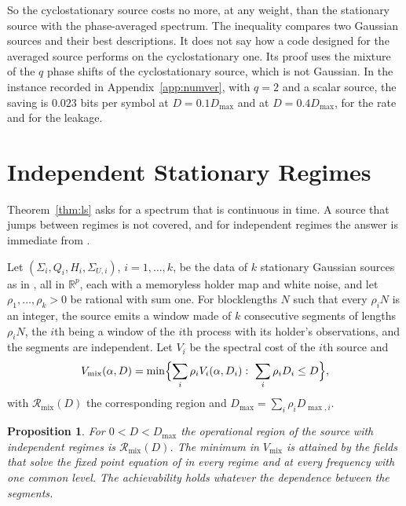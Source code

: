 \documentclass[11pt,onecolumn]{IEEEtran}
\newtheorem{proposition}[theorem]{Proposition}
\newcommand{\R}{\mathbb{R}}
\begin{document}
So the cyclostationary source costs no more, at any weight, than the
stationary source with the phase-averaged spectrum. The inequality
compares two Gaussian sources and their best descriptions. It does not
say how a code designed for the averaged source performs on the
cyclostationary one. Its proof uses the mixture
of the $q$ phase shifts of the cyclostationary source, which is not
Gaussian. In the instance recorded in Appendix~\ref{app:numver}, with
$q=2$ and a scalar source, the saving is $0.023$ bits per symbol at
$D=0.1D_{\max}$ and at $D=0.4D_{\max}$, for the rate and for the leakage.

\section{Independent Stationary Regimes}
\label{sec:regimes}

Theorem~\ref{thm:ls} asks for a spectrum that is continuous in time.
A source that jumps between regimes is not covered, and for
independent regimes the answer is immediate from \cite{part1}.

Let $(\Sigma_i,Q_i,H_i,\Sigma_{U,i})$, $i=1,\dots,k$, be the data of $k$
stationary Gaussian sources as in \cite{part2}, all in $\R^p$, each
with a memoryless holder map and white noise, and let
$\rho_1,\dots,\rho_k>0$ be rational with sum one. For blocklengths
$N$ such that every $\rho_iN$ is an integer, the source emits a
window made of $k$ consecutive segments of lengths $\rho_iN$, the
$i$th being a window of the $i$th process with its holder's
observations, and the segments are independent. Let $V_i$ be the
spectral cost of the $i$th source and
\[
V_{\mathrm{mix}}(\alpha,D)=\min\Bigl\{\sum_i\rho_iV_i(\alpha,D_i):\ \sum_i\rho_iD_i\le D\Bigr\},
\]
with $\mathcal R_{\mathrm{mix}}(D)$ the corresponding region and
$D_{\max}=\sum_i\rho_iD_{\max,i}$.

\begin{proposition}\label{prop:regimes}
For $0<D<D_{\max}$ the operational region of the source with
independent regimes is $\mathcal R_{\mathrm{mix}}(D)$. The minimum in
$V_{\mathrm{mix}}$ is attained by the fields that solve the fixed
point equation of \cite[Theorem~4]{part2} in every regime and at every
frequency with one common level. The achievability holds whatever the
dependence between the segments.
\end{proposition}
\end{document}
